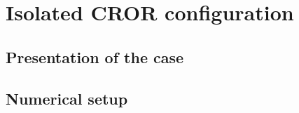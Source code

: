 \chapter{Isolated CROR configuration}
\label{cha:dream_isolated}

\chabstract{}

\minitoc
\newpage

\section{Presentation of the case}
\label{sec:dream_presentation}


\section{Numerical setup}
\label{sec:dream_numerical}


\chconclu{}
